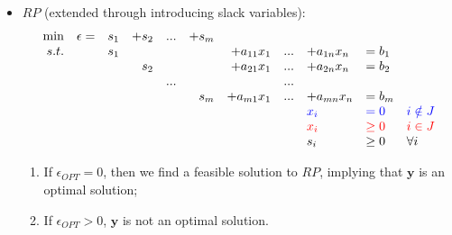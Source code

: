 \documentclass[mathserif]{beamer}
\begin{document}
{\begin{itemize}
\item $RP$ (extended through introducing slack variables):
\[
\begin{array}{rrrrrrrllllllllll}
 \min &\epsilon=&s_1    &+s_2   &...&+s_{m} &                   &    &                     &        & \\
 s.t.   &               &s_1    &           &   &            &+a_{11}x_1 &... &+a_{1n}x_{n} & =b_1 & \\
         &               &         &  s_2    &   &            &+a_{21}x_1 &... &+a_{2n}x_{n} & =b_2 & \\
         &               &         &           &...&            &                    &... &                     &          &\\
         &               &         &           &   & s_m    &+a_{m1}x_1 &... &+a_{mn}x_{n} & =b_m & \\
         &               &         &           &    &            &                         &   &\textcolor{blue}{x_i} & \textcolor{blue}{=  0}   &\textcolor{blue}{ i\notin J} \\
         &               &         &           &    &            &                         &    &\textcolor{red}{x_i}  &       \textcolor{red}{\geq  0}   & \textcolor{red}{i\in J} \\
         &               &         &           &     &            &                        &    &             s_i     & \geq 0 &  \forall i  \\
     \end{array} \nonumber
\]
\begin{enumerate}
 \item 
If $\epsilon_{OPT} = 0$, then we find a feasible solution to $RP$, implying that $\mathbf{y}$ is an optimal solution; 
\item 
If $\epsilon_{OPT} > 0$, $\mathbf{y}$ is not an optimal solution. 
\end{enumerate}
\end{itemize} 
} 
\end{document}
